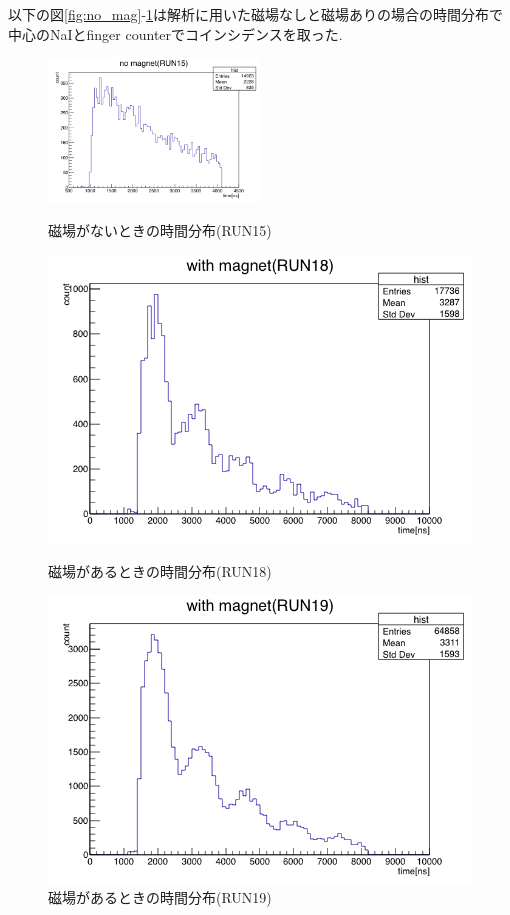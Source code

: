 以下の図\ref{fig:no_mag}-\ref{fig:with_mag_RUN19}は解析に用いた磁場なしと磁場ありの場合の時間分布で中心のNaIとfinger counterでコインシデンスを取った.
\begin{figure}[H]
  \centering
  \includegraphics[width  = 0.5\textwidth]{figure/mino/no_mag.png}
  \caption{磁場がないときの時間分布(RUN15)}
  \label{fig:no_mag}
  \begin{minipage}{0.45\hsize}
    \centering
    \includegraphics[width  = 1.0\textwidth]{figure/mino/with_mag_RUN18.png}
    \caption{磁場があるときの時間分布(RUN18)}
  \end{minipage}
  \begin{minipage}{0.45\hsize}
    \centering
    \includegraphics[width  = 1.0\textwidth]{figure/mino/with_mag_RUN19.png}
    \caption{磁場があるときの時間分布(RUN19)}
    \label{fig:with_mag_RUN19}
  \end{minipage}
\end{figure}

